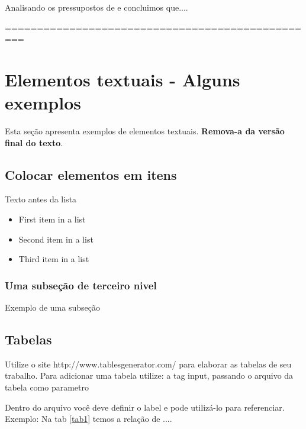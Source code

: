 \documentclass[	DIV=calc,%
paper=a4,%
fontsize=12pt,%
onecolumn]{scrartcl}	 					%
\begin{document}
	Analisando os pressupostos de \cite{ref3} e \cite{ref4} concluimos que....
	
	
	\renewcommand\refname{} %
	
	  
	
	=================================================
	\section{Elementos textuais - Alguns exemplos}
	
	Esta seção apresenta exemplos de elementos textuais. \textbf{Remova-a da versão final do texto}.
	
	
	\subsection{Colocar elementos em itens}
	
	Texto antes da lista
	
	\begin{itemize}
		\item First item in a list 
		\item Second item in a list 
		\item Third item in a list
	\end{itemize}
	
	\subsubsection{Uma subseção de terceiro nivel}
	
	Exemplo de uma subseção
	
	\subsection{Tabelas}
	
	Utilize o site http://www.tablesgenerator.com/ para elaborar as tabelas de seu trabalho.
	Para adicionar uma tabela utilize: a tag input, passando o arquivo da tabela como parametro
	
	
	
	Dentro do arquivo você deve definir o label e pode utilizá-lo para referenciar. Exemplo:
	Na tab \ref{tab1} temos a relação de ....
	
\end{document}
